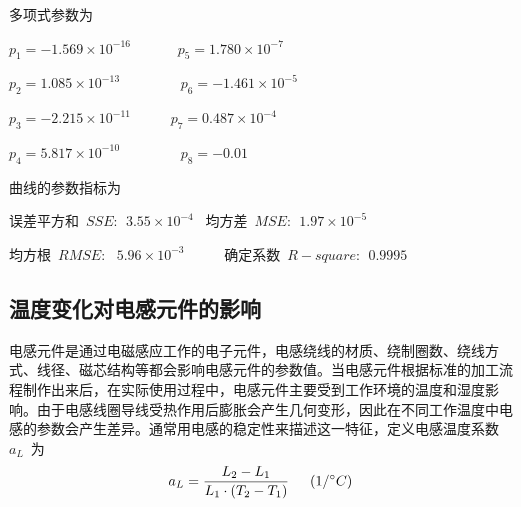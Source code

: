 多项式参数为

\qquad \qquad $p_1=-1.569\times 10^{-16}$     ~~~~~\qquad \qquad ~$p_5= 1.780\times 10^{-7} $

\qquad \qquad  $p_2= 1.085\times 10^{-13}$    ~~~~~\qquad \qquad ~~~$p_6=-1.461\times 10^{-5}$

\qquad \qquad $p_3=-2.215\times 10^{-11}$     ~~~~~\qquad \qquad $p_7= 0.487\times 10^{-4}$

\qquad \qquad $p_4= 5.817\times 10^{-10}$     ~~~~~\qquad \qquad ~~~$ p_8=-0.01$

\iffalse
\begin{table}[htbp]
  \centering
\begin{tabular}{p{5cm}p{5cm}}

  $p_1=-1.569\times 10^{-16}$     & $p_5= 1.780\times 10^{-7} $\\

  $p_2= 1.085\times 10^{-13}$     & $p_6=-1.461\times 10^{-5}$ \\

  $p_3=-2.215\times 10^{-11}$     & $p_7= 0.487\times 10^{-4}$ \\

 $p_4= 5.817\times 10^{-10}$      & $ p_8=-0.01$ \\

\end{tabular}
\end{table}
\fi
曲线的参数指标为

\qquad  误差平方和~$SSE\colon~~3.55\times10^{-4}$  ~\qquad   均方差~$MSE\colon~~1.97\times10^{-5} $

\qquad 均方根~$RMSE\colon~~~5.96\times10^{-3}$    ~~~~~\qquad 确定系数~$R-square\colon~~0.9995$

\subsection{温度变化对电感元件的影响}
电感元件是通过电磁感应工作的电子元件，电感绕线的材质、绕制圈数、绕线方式、线径、磁芯结构等都会影响电感元件的参数值。当电感元件根据标准的加工流程制作出来后，在实际使用过程中，电感元件主要受到工作环境的温度和湿度影响。由于电感线圈导线受热作用后膨胀会产生几何变形，因此在不同工作温度中电感的参数会产生差异。通常用电感的稳定性来描述这一特征\cite{Wang2006Electronic}，定义电感温度系数~$a_{L}$~为
\begin{equation}\label{equ:chap2:Index4}
a_L=\displaystyle\frac{L_2-L_1}{L_1\cdot\left(T_2-T_1\right)}~~~~\left(1/^{\circ}C\right)
\end{equation}

